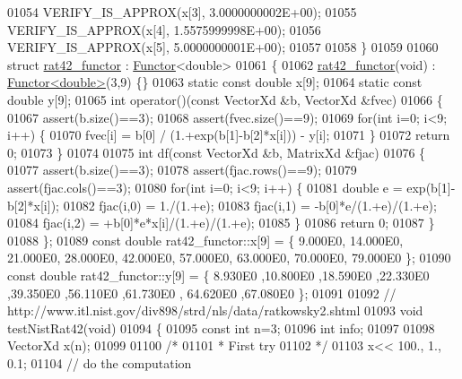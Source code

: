 \begin{DoxyCode}
01054   VERIFY\_IS\_APPROX(x[3], 3.0000000002E+00);
01055   VERIFY\_IS\_APPROX(x[4], 1.5575999998E+00);
01056   VERIFY\_IS\_APPROX(x[5], 5.0000000001E+00);
01057 
01058 \}
01059 
01060 \textcolor{keyword}{struct }\hyperlink{structrat42__functor}{rat42\_functor} : \hyperlink{struct_functor}{Functor}<double>
01061 \{
01062     \hyperlink{structrat42__functor}{rat42\_functor}(\textcolor{keywordtype}{void}) : \hyperlink{struct_functor}{Functor<double>}(3,9) \{\}
01063     \textcolor{keyword}{static} \textcolor{keyword}{const} \textcolor{keywordtype}{double} x[9];
01064     \textcolor{keyword}{static} \textcolor{keyword}{const} \textcolor{keywordtype}{double} y[9];
01065     \textcolor{keywordtype}{int} operator()(\textcolor{keyword}{const} VectorXd &b, VectorXd &fvec)
01066     \{
01067         assert(b.size()==3);
01068         assert(fvec.size()==9);
01069         \textcolor{keywordflow}{for}(\textcolor{keywordtype}{int} i=0; i<9; i++) \{
01070             fvec[i] = b[0] / (1.+exp(b[1]-b[2]*x[i])) - y[i];
01071         \}
01072         \textcolor{keywordflow}{return} 0;
01073     \}
01074 
01075     \textcolor{keywordtype}{int} df(\textcolor{keyword}{const} VectorXd &b, MatrixXd &fjac)
01076     \{
01077         assert(b.size()==3);
01078         assert(fjac.rows()==9);
01079         assert(fjac.cols()==3);
01080         \textcolor{keywordflow}{for}(\textcolor{keywordtype}{int} i=0; i<9; i++) \{
01081             \textcolor{keywordtype}{double} e = exp(b[1]-b[2]*x[i]);
01082             fjac(i,0) = 1./(1.+e);
01083             fjac(i,1) = -b[0]*e/(1.+e)/(1.+e);
01084             fjac(i,2) = +b[0]*e*x[i]/(1.+e)/(1.+e);
01085         \}
01086         \textcolor{keywordflow}{return} 0;
01087     \}
01088 \};
01089 \textcolor{keyword}{const} \textcolor{keywordtype}{double} rat42\_functor::x[9] = \{ 9.000E0, 14.000E0, 21.000E0, 28.000E0, 42.000E0, 57.000E0, 63.000E0, 
      70.000E0, 79.000E0 \};
01090 \textcolor{keyword}{const} \textcolor{keywordtype}{double} rat42\_functor::y[9] = \{ 8.930E0 ,10.800E0 ,18.590E0 ,22.330E0 ,39.350E0 ,56.110E0 ,61.730E0 ,
      64.620E0 ,67.080E0 \};
01091 
01092 \textcolor{comment}{// http://www.itl.nist.gov/div898/strd/nls/data/ratkowsky2.shtml}
01093 \textcolor{keywordtype}{void} testNistRat42(\textcolor{keywordtype}{void})
01094 \{
01095   \textcolor{keyword}{const} \textcolor{keywordtype}{int} n=3;
01096   \textcolor{keywordtype}{int} info;
01097 
01098   VectorXd x(n);
01099 
01100   \textcolor{comment}{/*}
01101 \textcolor{comment}{   * First try}
01102 \textcolor{comment}{   */}
01103   x<< 100., 1., 0.1;
01104   \textcolor{comment}{// do the computation}

\end{DoxyCode}
